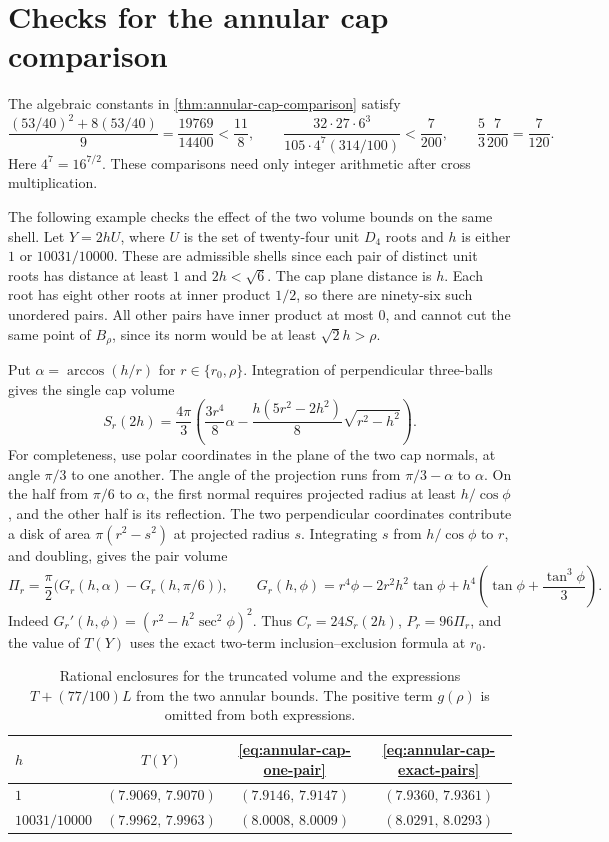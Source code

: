 \section{Checks for the annular cap comparison}
\label{app:annular-cap-comparison}

The algebraic constants in \cref{thm:annular-cap-comparison}
satisfy
\[
 \frac{(53/40)^2+8(53/40)}9=\frac{19769}{14400}<\frac{11}{8},
 \qquad
 \frac{32\cdot27\cdot6^3}{105\cdot4^7(314/100)}<\frac7{200},
 \qquad \frac{5}{3}\frac7{200}=\frac7{120}.
\]
Here \(4^7=16^{7/2}\). These comparisons need only integer
arithmetic after cross multiplication.

The following example checks the effect of the two volume
bounds on the same shell. Let \(Y=2hU\), where \(U\) is the
set of twenty-four unit \(D_4\) roots and \(h\) is either
\(1\) or \(10031/10000\). These are admissible shells since
each pair of distinct unit roots has distance at least \(1\)
and \(2h<\sqrt6\). The cap plane distance is \(h\).
Each root has eight other roots at inner product \(1/2\),
so there are ninety-six such unordered pairs. All other
pairs have inner product at most \(0\), and cannot cut the
same point of \(B_\rho\), since its norm would be at least
\(\sqrt2h>\rho\).

Put \(\alpha=\arccos(h/r)\) for \(r\in\{r_0,\rho\}\).
Integration of perpendicular three-balls gives the single
cap volume
\[
 S_r(2h)=\frac{4\pi}{3}
 \left(\frac{3r^4}{8}\alpha-
       \frac{h(5r^2-2h^2)}8\sqrt{r^2-h^2}\right).
\]
For completeness, use polar coordinates in the plane of
the two cap normals, at angle \(\pi/3\) to one another.
The angle of the projection runs from \(\pi/3-\alpha\)
to \(\alpha\). On the half from \(\pi/6\) to \(\alpha\),
the first normal requires projected radius at least
\(h/\cos\phi\), and the other half is its reflection.
The two perpendicular coordinates contribute a disk of
area \(\pi(r^2-s^2)\) at projected radius \(s\).
Integrating \(s\) from \(h/\cos\phi\) to \(r\), and doubling,
gives the pair volume
\[
 \Pi_r=\frac{\pi}{2}\bigl(G_r(h,\alpha)-G_r(h,\pi/6)\bigr),
 \qquad
 G_r(h,\phi)=r^4\phi-2r^2h^2\tan\phi+
                    h^4\left(\tan\phi+\frac{\tan^3\phi}{3}\right).
\]
Indeed \(G_r'(h,\phi)=(r^2-h^2\sec^2\phi)^2\).
Thus \(C_r=24S_r(2h)\), \(P_r=96\Pi_r\), and the value of
\(T(Y)\) uses the exact two-term inclusion--exclusion formula
at \(r_0\).

\begin{table}[ht]
\centering
\caption{Rational enclosures for the truncated volume and
the expressions \(T+(77/100)L\) from the two annular bounds.
The positive term \(g(\rho)\) is omitted from both expressions.}
\label{tab:annular-cap-check}
\begin{tabular}{@{}lccc@{}}
\toprule
\(h\) & \(T(Y)\) & \cref{eq:annular-cap-one-pair} & \cref{eq:annular-cap-exact-pairs}\\
\midrule
\(1\) & \( (7.9069,\,7.9070) \) & \( (7.9146,\,7.9147) \) & \( (7.9360,\,7.9361) \)\\
\(10031/10000\) & \( (7.9962,\,7.9963) \) & \( (8.0008,\,8.0009) \) & \( (8.0291,\,8.0293) \)\\
\bottomrule
\end{tabular}
\end{table}

